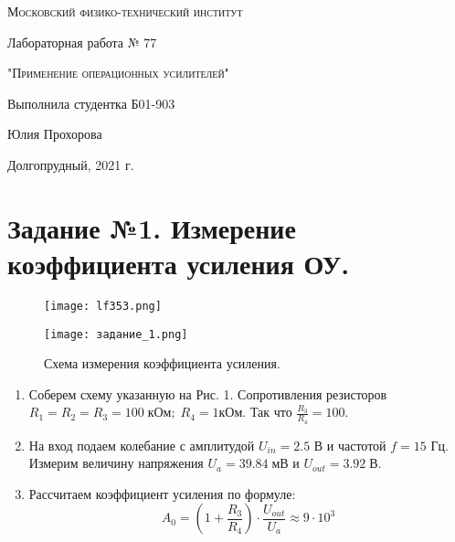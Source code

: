 \documentclass[12pt,a4paper]{article}
\begin{document}
\begin{titlepage}
	\centering
	\vspace{5cm}
	{\scshape\LARGE Московский физико-технический институт \par}
	\vspace{5cm}

	{\huge Лабораторная работа № 77 \par}
	\vspace{1cm}
	{\scshape\Large "Применение операционных усилителей"\par}
	\vspace{2cm}
	\vfill
\begin{flushright}
	{\Large Выполнила студентка Б01-903}\par
	\vspace{0.3cm}
	{\LARGE Юлия Прохорова} \par

	
\end{flushright}
	

	\vfill\large

	Долгопрудный, 2021 г.
\end{titlepage}

\section{Задание №1. Измерение коэффициента усиления ОУ.}


 \begin{figure}[H]
        \begin{center}
        \texttt{[image: lf353.png]}
        \label{real} %
        \end{center}
    \end{figure}

    \begin{figure}[H]
        \begin{center}
        \texttt{[image: задание\_1.png]}
        \caption{Схема измерения коэффициента усиления.}
        \label{2} %
        \end{center}
    \end{figure}
    
    
\begin{enumerate}
    \item Соберем схему указанную на Рис. 1. Сопротивления резисторов $R_1 = R_2 = R_3 = 100 \; кОм ; \; R_4 = 1кОм$. Так что $\frac{R_3}{R_4} = 100$. 
    \item На вход подаем колебание с амплитудой $U_{in} = 2.5$ В и частотой $f = 15$ Гц. Измерим величину напряжения $U_a = 39.84 \;мВ$ и $ U_{out} = 3.92 \; В$.
    \item Рассчитаем коэффициент усиления по формуле:
    \begin{equation}
       A_0 = (1+\frac{R_3}{R_4})\cdot \frac{U_{out}}{U_a} \approx 9 \cdot 10^3
    \end{equation}

\end{enumerate}
\end{document}
